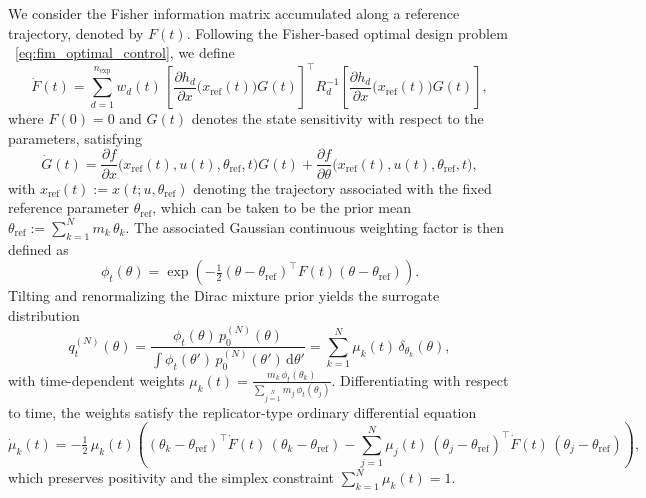 \documentclass[a4paper,11pt]{article}
\begin{document}
We consider the Fisher information matrix accumulated along a reference trajectory, denoted by $F(t)$. Following the Fisher-based optimal design problem
~\eqref{eq:fim_optimal_control}, we define
\[
\dot{F}(t)
=
\sum_{d=1}^{n_{\mathrm{exp}}}
w_d(t)\,
\left[\frac{\partial h_d}{\partial x}\bigl(x_\mathrm{ref}(t)\bigr) G(t)\right]^\top
R_d^{-1}
\left[\frac{\partial h_d}{\partial x}\bigl(x_\mathrm{ref}(t)\bigr) G(t)\right],
\]
where $F(0)=0$
and $G(t)$ denotes the state sensitivity with respect
to the parameters, satisfying
\[
\dot{G}(t)
=
\frac{\partial f}{\partial x}\bigl(x_\mathrm{ref}(t),u(t),\theta_\mathrm{ref},t\bigr)G(t)
+
\frac{\partial f}{\partial \theta}\bigl(x_\mathrm{ref}(t),u(t),\theta_\mathrm{ref},t\bigr),
\]
with $x_{\mathrm{ref}}(t):=x(t;u,\theta_{\mathrm{ref}})$ denoting the trajectory
associated with the fixed reference parameter $\theta_{\mathrm{ref}}$, which can
be taken to be the prior mean
\(
\theta_\mathrm{ref} := \sum_{k=1}^N m_k\,\theta_k .
\)
The associated Gaussian continuous weighting factor is then defined as
\[
\phi_t(\theta)
=
\exp\!\left(
-\tfrac12(\theta-\theta_\mathrm{ref})^\top F(t)(\theta-\theta_\mathrm{ref})
\right).
\]
Tilting and renormalizing the Dirac mixture prior yields the surrogate distribution
\begin{equation}
q_t^{(N)}(\theta)
=
\frac{\phi_t(\theta)\,p_0^{(N)}(\theta)}
{\int \phi_t(\theta')\,p_0^{(N)}(\theta')\,\mathrm d\theta'}
=
\sum_{k=1}^N \mu_k(t)\,\delta_{\theta_k}(\theta),
\label{eq:dirac-tilted-ct}
\end{equation}
with time-dependent weights
\(
\mu_k(t)
=
\frac{m_k\,\phi_t(\theta_k)}
{\sum_{j=1}\limits^N m_j\,\phi_t(\theta_j)}.
\)
Differentiating with respect to time, the weights satisfy the
replicator-type ordinary differential equation
\[
\dot \mu_k(t)
=
-\tfrac12\,\mu_k(t)
\left(
(\theta_k-\theta_\mathrm{ref})^\top \dot{F}(t)\,(\theta_k-\theta_\mathrm{ref})
-
\sum_{j=1}^N \mu_j(t)\,(\theta_j-\theta_\mathrm{ref})^\top \dot{F}(t)\,(\theta_j-\theta_\mathrm{ref})
\right),
\]
which preserves positivity and the simplex constraint
$\sum\limits_{k=1}^N \mu_k(t)=1$.
\end{document}
